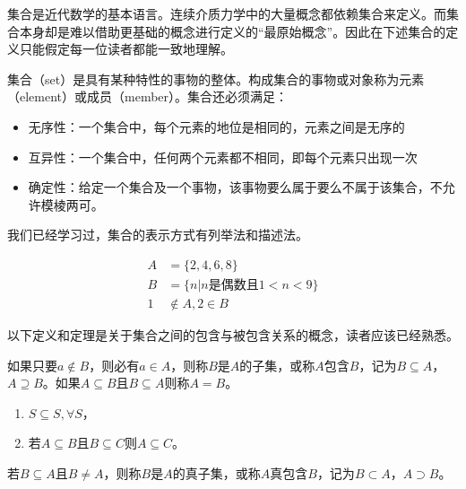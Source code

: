 \documentclass[main.tex]{subfiles}
\begin{document}
集合是近代数学的基本语言。连续介质力学中的大量概念都依赖集合来定义。而集合本身却是难以借助更基础的概念进行定义的“最原始概念”。因此在下述集合的定义只能假定每一位读者都能一致地理解。
\begin{definition}[集合]\label{def:II.1.1}
集合（set）是具有某种特性的事物的整体。构成集合的事物或对象称为元素（element）或成员（member）。集合还必须满足：
\begin{itemize}
    \item 无序性：一个集合中，每个元素的地位是相同的，元素之间是无序的
    \item 互异性：一个集合中，任何两个元素都不相同，即每个元素只出现一次
    \item 确定性：给定一个集合及一个事物，该事物要么属于要么不属于该集合，不允许模棱两可。
\end{itemize}
\end{definition}

我们已经学习过，集合的表示方式有列举法和描述法。

\begin{example}
\begin{align*}
    A&=\{2,4,6,8\}\\
    B&=\{n|n\text{是偶数且}1<n<9\}\\
    1&\notin A, 2\in B
\end{align*}
\end{example}

以下定义和定理是关于集合之间的包含与被包含关系的概念，读者应该已经熟悉。

\begin{definition}[子集、包含、集合的相等]
如果只要\(a\notin B\)，则必有\(a\in A\)，则称$B$是$A$的子集，或称$A$包含$B$，记为\(B\subseteq A\)，\(A\supseteq B\)。如果\(A\subseteq B\)且\(B\subseteq A\)则称\(A=B\)。
\end{definition}

\begin{theorem}
\begin{enumerate}
\item \(S\subseteq S, \forall S\)，
\item 若\(A\subseteq B\)且\(B\subseteq C\)则\(A\subseteq C\)。
\end{enumerate}
\end{theorem}

\begin{definition}
若\(B\subseteq A\)且\(B\neq A\)，则称$B$是$A$的真子集，或称$A$真包含$B$，记为\(B\subset A\)，\(A\supset B\)。
\end{definition}
\end{document}
